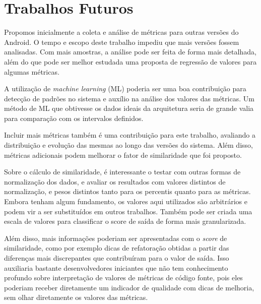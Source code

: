 \section{Trabalhos Futuros}

Propomos inicialmente a coleta e análise de métricas para outras versões do Android. O tempo e escopo deste trabalho impediu que mais versões fossem analisadas. Com mais amostras, a análise pode ser feita de forma mais detalhada, além do que pode ser melhor estudada uma proposta de regressão de valores para algumas métricas.

A utilização de \textit{machine learning} (ML) poderia ser uma boa contribuição para detecção de padrões no sistema e auxílio na análise dos valores das métricas. Um método de ML que obtivesse os dados ideais da arquitetura seria de grande valia para comparação com os intervalos definidos.

Incluir mais métricas também é uma contribuição para este trabalho, avaliando a distribuição e evolução das mesmas ao longo das versões do sistema. Além disso, métricas adicionais podem melhorar o fator de similaridade que foi proposto.

Sobre o cálculo de similaridade, é interessante o testar com outras formas de normalização dos dados, e avaliar os resultados com valores distintos de normalização, e pesos distintos tanto para os percentis quanto para as métricas. Embora tenham algum fundamento, os valores aqui utilizados são arbitrários e podem vir a ser substituídos em outros trabalhos. Também pode ser criada uma escala de valores para classificar o score de saída de forma mais granularizada.

Além disso, mais informações poderiam ser apresentadas com o \textit{score} de similaridade, como por exemplo dicas de refatoração obtidas a partir das diferenças mais discrepantes que contribuíram para o valor de saída. Isso auxiliaria bastante desenvolvedores iniciantes que não tem conhecimento profundo sobre interpretação de valores de métricas de código fonte, pois eles poderiam receber diretamente um indicador de qualidade com dicas de melhoria, sem olhar diretamente os valores das métricas.